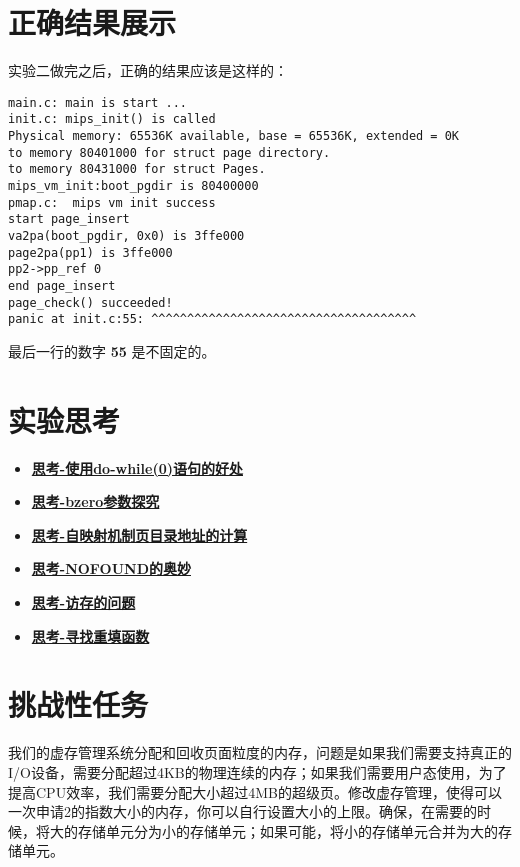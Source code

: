 \section{正确结果展示}

实验二做完之后，正确的结果应该是这样的：

\begin{verbatim}
main.c: main is start ...
init.c: mips_init() is called
Physical memory: 65536K available, base = 65536K, extended = 0K
to memory 80401000 for struct page directory.
to memory 80431000 for struct Pages.
mips_vm_init:boot_pgdir is 80400000
pmap.c:  mips vm init success
start page_insert
va2pa(boot_pgdir, 0x0) is 3ffe000
page2pa(pp1) is 3ffe000
pp2->pp_ref 0
end page_insert
page_check() succeeded!
panic at init.c:55: ^^^^^^^^^^^^^^^^^^^^^^^^^^^^^^^^^^^^^
\end{verbatim}

最后一行的数字 \textbf{55} 是不固定的。

\section{实验思考}

\begin{itemize}
\item \hyperref[think-do_while]{\textbf{\textcolor{baseB}{思考-使用do-while(0)语句的好处}}}
\item \hyperref[think-bzero]{\textbf{\textcolor{baseB}{思考-bzero参数探究}}}
\item \hyperref[think-windows_pde_addr]{\textbf{\textcolor{baseB}{思考-自映射机制页目录地址的计算}}}
\item \hyperref[think-tlb]{\textbf{\textcolor{baseB}{思考-NOFOUND的奥妙}}}
\item \hyperref[think-memory-access]{\textbf{\textcolor{baseB}{思考-访存的问题}}}
\item \hyperref[think-tlb-refill]{\textbf{\textcolor{baseB}{思考-寻找重填函数}}}
\end{itemize}

\section{挑战性任务}

我们的虚存管理系统分配和回收页面粒度的内存，问题是如果我们需要支持真正的I/O设备，需要分配超过4KB的物理连续的内存；如果我们需要用户态使用，为了提高CPU效率，我们需要分配大小超过4MB的超级页。修改虚存管理，使得可以一次申请2的指数大小的内存，你可以自行设置大小的上限。确保，在需要的时候，将大的存储单元分为小的存储单元；如果可能，将小的存储单元合并为大的存储单元。
